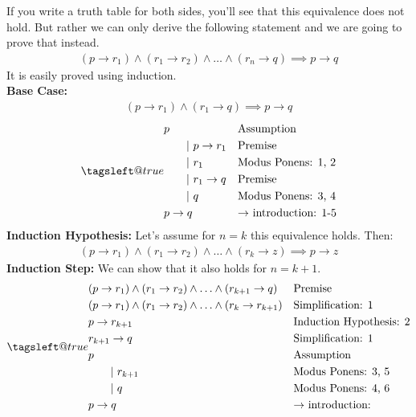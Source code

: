 \documentclass[11pt]{article}
\makeatletter
\newcommand{\leqnomode}{\tagsleft@true}
\newcommand{\tab}[1][30pt]{\hspace*{#1}}
\newcommand{\infrule}[2]{&#1 &&\textup{#2}}
\newcommand{\subrule}{\tab[20pt]\vert\ }
\newcommand{\subinfrule}[2]{&\subrule #1 &&\textup{#2}}
\makeatother
\begin{document}
\subsubsection{}
If you write a truth table for both sides, you'll see that this equivalence does not hold.
But rather we can only derive the following statement and we are going to prove that instead.
\begin{align}
(p \to r_1) \land (r_1 \to r_2) \land \ldots \land (r_n \to q) \implies p \to q
\end{align}
It is easily proved using induction.\\
\textbf{Base Case:} 
\begin{align}
    (p \to r_1) \land (r_1 \to q) \implies p \to q
\end{align}
\begin{subequations}
    \leqnomode
    \renewcommand{\theequation}{\arabic{equation}}
    \begin{align}
    \infrule{p}{Assumption}\\
    \subinfrule{p \to r_1}{Premise}\\
    \subinfrule{r_1}{Modus Ponens: 1, 2}\\
    \subinfrule{r_1 \to q}{Premise}\\
    \subinfrule{q}{Modus Ponens: 3, 4}\\
    \infrule{p \to q}{$\to$ introduction: 1-5}
    \end{align}
\end{subequations}
\textbf{Induction Hypothesis:} Let's assume for $n=k$ this equivalence holds. Then:
\begin{align}
    (p \to r_1) \land (r_1 \to r_2) \land \ldots \land (r_k \to z) \implies p \to z
\end{align}
\textbf{Induction Step:}
We can show that it also holds for $n=k+1$.
\begin{subequations}
    \leqnomode
    \renewcommand{\theequation}{\arabic{equation}}
    \begin{align}
    \infrule{(p \to r_1) \land (r_1 \to r_2) \land \ldots \land (r_{k+1} \to q)}{Premise}\\
    \infrule{(p \to r_1) \land (r_1 \to r_2) \land \ldots \land (r_{k} \to r_{k+1})}{Simplification: 1}\\
    \infrule{p \to r_{k+1}}{Induction Hypothesis: 2}\\
    \infrule{r_{k+1} \to q}{Simplification: 1}\\
    \infrule{p}{Assumption}\\
    \subinfrule{r_{k+1}}{Modus Ponens: 3, 5}\\
    \subinfrule{q}{Modus Ponens: 4, 6}\\
    \infrule{p \to q}{$\to$ introduction:}
    \end{align}
\end{subequations}
\end{document}
